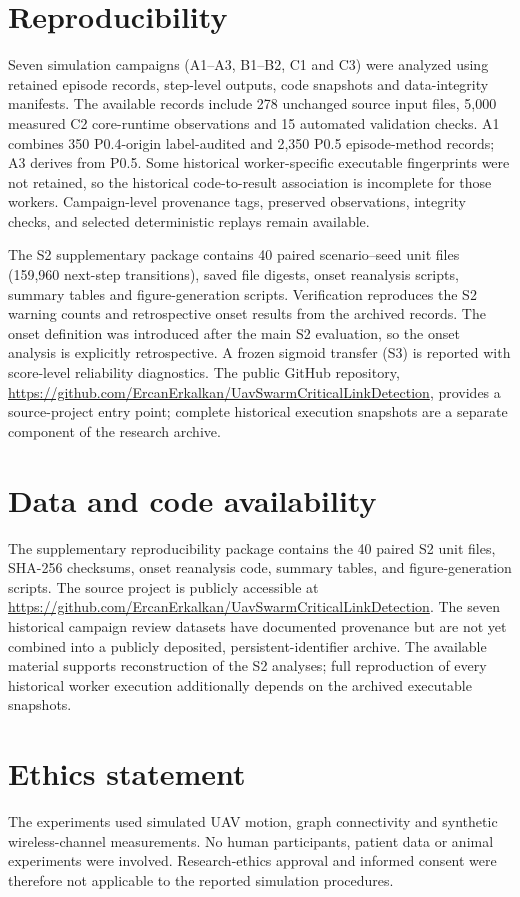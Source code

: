 \documentclass[preprint,12pt]{elsarticle}
\theoremstyle{definition}\newtheorem{definition}{Definition}
\theoremstyle{plain}\newtheorem{theorem}{Theorem}
\theoremstyle{plain}\newtheorem{lemma}{Lemma}
\theoremstyle{plain}\newtheorem{corollary}{Corollary}
\theoremstyle{plain}\newtheorem{assumption}{Assumption}
\theoremstyle{remark}\newtheorem{remark}[theorem]{Remark}
\begin{document}
\section{Reproducibility}
\label{sec:reproducibility}
Seven simulation campaigns (A1--A3, B1--B2, C1 and C3) were analyzed using retained episode records, step-level outputs, code snapshots and data-integrity manifests. The available records include 278 unchanged source input files, 5,000 measured C2 core-runtime observations and 15 automated validation checks. A1 combines 350 P0.4-origin label-audited and 2,350 P0.5 episode-method records; A3 derives from P0.5. Some historical worker-specific executable fingerprints were not retained, so the historical code-to-result association is incomplete for those workers. Campaign-level provenance tags, preserved observations, integrity checks, and selected deterministic replays remain available.

The S2 supplementary package contains 40 paired scenario--seed unit files (159,960 next-step transitions), saved file digests, onset reanalysis scripts, summary tables and figure-generation scripts. Verification reproduces the S2 warning counts and retrospective onset results from the archived records. The onset definition was introduced after the main S2 evaluation, so the onset analysis is explicitly retrospective. A frozen sigmoid transfer (S3) is reported with score-level reliability diagnostics. The public GitHub repository, \url{https://github.com/ErcanErkalkan/UavSwarmCriticalLinkDetection}, provides a source-project entry point; complete historical execution snapshots are a separate component of the research archive.

\section*{Data and code availability}
The supplementary reproducibility package contains the 40 paired S2 unit files, SHA-256 checksums, onset reanalysis code, summary tables, and figure-generation scripts. The source project is publicly accessible at \url{https://github.com/ErcanErkalkan/UavSwarmCriticalLinkDetection}. The seven historical campaign review datasets have documented provenance but are not yet combined into a publicly deposited, persistent-identifier archive. The available material supports reconstruction of the S2 analyses; full reproduction of every historical worker execution additionally depends on the archived executable snapshots.

\section*{Ethics statement}
The experiments used simulated UAV motion, graph connectivity and synthetic wireless-channel measurements. No human participants, patient data or animal experiments were involved. Research-ethics approval and informed consent were therefore not applicable to the reported simulation procedures.
\end{document}
